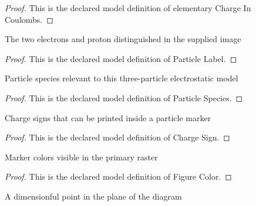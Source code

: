 \begin{proof}
  This is the declared model definition of elementary Charge In Coulombs.
\end{proof}
\begin{definition}
  \label{def:physics:phyx-mini-0854:phyxminiproblems-problemphyxmini0854-particlelabel}
  The two electrons and proton distinguished in the supplied image
\end{definition}
\begin{proof}
  This is the declared model definition of Particle Label.
\end{proof}
\begin{definition}
  \label{def:physics:phyx-mini-0854:phyxminiproblems-problemphyxmini0854-particlespecies}
  Particle species relevant to this three-particle electrostatic model
\end{definition}
\begin{proof}
  This is the declared model definition of Particle Species.
\end{proof}
\begin{definition}
  \label{def:physics:phyx-mini-0854:phyxminiproblems-problemphyxmini0854-chargesign}
  Charge signs that can be printed inside a particle marker
\end{definition}
\begin{proof}
  This is the declared model definition of Charge Sign.
\end{proof}
\begin{definition}
  \label{def:physics:phyx-mini-0854:phyxminiproblems-problemphyxmini0854-figurecolor}
  Marker colors visible in the primary raster
\end{definition}
\begin{proof}
  This is the declared model definition of Figure Color.
\end{proof}
\begin{definition}
  \label{def:physics:phyx-mini-0854:phyxminiproblems-problemphyxmini0854-planepoint}
  A dimensionful point in the plane of the diagram
\end{definition}
